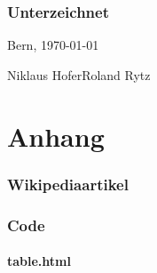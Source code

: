 \documentclass[11pt,paper=a4,final]{scrartcl}
\begin{document}
\section{Unterzeichnet}
Bern, \today{}

\vspace{0.5cm}
\noindent
Niklaus Hofer\hfill Roland Rytz

\vspace{2cm}
\noindent
\hrulefill \hfill \hrulefill
\newpage
\listoftables
\listoffigures
{}


\part{Anhang}
\label{part:anhang}
\section{Wikipediaartikel}
\section{Code}
\subsection{table.html}
\lstset{language=JavaScript,frame=single,breaklines=true}

\end{document}

